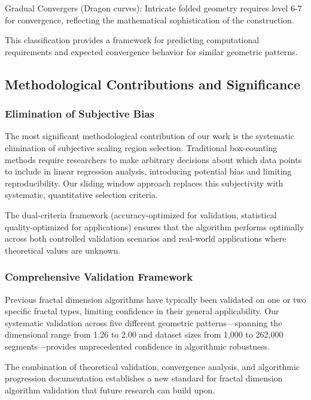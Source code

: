 \documentclass[preprint,12pt]{elsarticle}
\def\textbf#1{#1}%
\begin{document}
\textbf{Gradual Convergers} (Dragon curves): Intricate folded geometry requires level 6-7 for convergence, reflecting the mathematical sophistication of the construction.

This classification provides a framework for predicting computational requirements and expected convergence behavior for similar geometric patterns.

\subsection{Methodological Contributions and Significance}

\subsubsection{Elimination of Subjective Bias}

The most significant methodological contribution of our work is the systematic elimination of subjective scaling region selection. Traditional box-counting methods require researchers to make arbitrary decisions about which data points to include in linear regression analysis, introducing potential bias and limiting reproducibility. Our sliding window approach replaces this subjectivity with systematic, quantitative selection criteria.

The dual-criteria framework (accuracy-optimized for validation, statistical quality-optimized for applications) ensures that the algorithm performs optimally across both controlled validation scenarios and real-world applications where theoretical values are unknown.

\subsubsection{Comprehensive Validation Framework}

Previous fractal dimension algorithms have typically been validated on one or two specific fractal types, limiting confidence in their general applicability. Our systematic validation across five different geometric patterns—spanning the dimensional range from 1.26 to 2.00 and dataset sizes from 1,000 to 262,000 segments—provides unprecedented confidence in algorithmic robustness.

The combination of theoretical validation, convergence analysis, and algorithmic progression documentation establishes a new standard for fractal dimension algorithm validation that future research can build upon.
\end{document}
